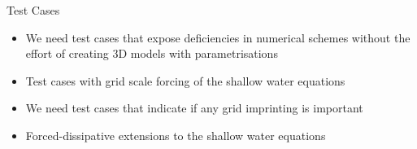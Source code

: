 \begin{slide}{Test Cases}

\begin{itemize}

\item We need test cases that expose deficiencies in numerical schemes without the effort of creating 3D models with parametrisations

\item Test cases with grid scale forcing of the shallow water equations

\item We need test cases that indicate if any grid imprinting is important

\item Forced-dissipative extensions to the shallow water equations

\end{itemize}

\end{slide}
